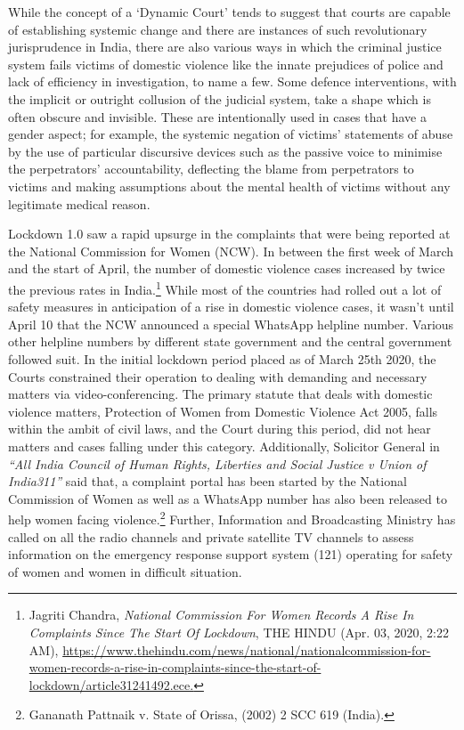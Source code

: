 \begin{multicols}{2}
\noi
While the concept of a ‘Dynamic Court’ tends to suggest that courts are capable of
establishing systemic change and there are instances of such revolutionary jurisprudence in
India, there are also various ways in which the criminal justice system fails victims of
domestic violence like the innate prejudices of police and lack of efficiency in investigation,
to name a few. Some defence interventions, with the implicit or outright collusion of the
judicial system, take a shape which is often obscure and invisible. These are intentionally
used in cases that have a gender aspect; for example, the systemic negation of victims’
statements of abuse by the use of particular discursive devices such as the passive voice to
minimise the perpetrators’ accountability, deflecting the blame from perpetrators to victims
and making assumptions about the mental health of victims without any legitimate medical
reason. 

\vspace{-.1cm}


\vspace{-.1cm}

\noi
Lockdown 1.0 saw a rapid upsurge in the complaints that were being reported at the National
Commission for Women (NCW). In between the first week of March and the start of April,
the number of domestic violence cases increased by twice the previous rates in India.\footnote{Jagriti Chandra, \textit{National Commission For Women Records A Rise In Complaints Since The Start Of
Lockdown}, THE HINDU (Apr. 03, 2020, 2:22 AM), \url{https://www.thehindu.com/news/national/nationalcommission-for-women-records-a-rise-in-complaints-since-the-start-of-lockdown/article31241492.ece.}} While
most of the countries had rolled out a lot of safety measures in anticipation of a rise in
domestic violence cases, it wasn’t until April 10 that the NCW announced a special
WhatsApp helpline number. Various other helpline numbers by different state government
and the central government followed suit. In the initial lockdown period placed as of March
25th 2020, the Courts constrained their operation to dealing with demanding and necessary
matters via video-conferencing. The primary statute that deals with domestic violence
matters, Protection of Women from Domestic Violence Act 2005, falls within the ambit of
civil laws, and the Court during this period, did not hear matters and cases falling under this
category. Additionally, Solicitor General in \textit{“All India Council of Human Rights, Liberties
and Social Justice v Union of India311”} said that, a complaint portal has been started by the
National Commission of Women as well as a WhatsApp number has also been released to
help women facing violence.\footnote{Gananath Pattnaik v. State of Orissa, (2002) 2 SCC 619 (India).} Further, Information and Broadcasting Ministry has called on
all the radio channels and private satellite TV channels to assess information on the
emergency response support system (121) operating for safety of women and women in
difficult situation. 


\end{multicols}
